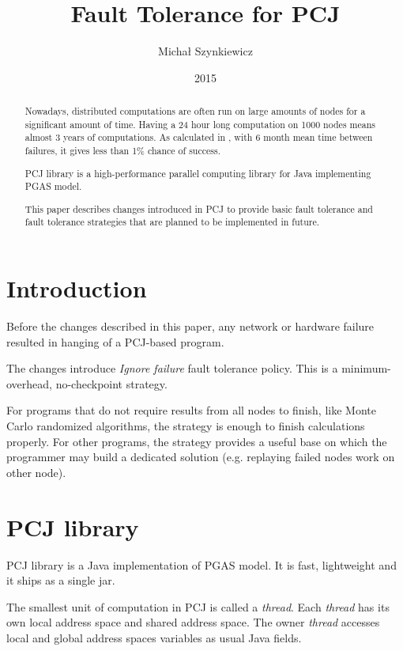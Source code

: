 \documentclass{llncs}
\begin{document}
\title{Fault Tolerance for PCJ}

\author{Michał Szynkiewicz}

\date{2015}
\maketitle

\begin{abstract}

Nowadays, distributed computations are often run on large amounts of nodes for a significant amount of time.
Having a 24 hour long computation on 1000 nodes means almost 3 years of computations.
As calculated in \cite{RX10}, with 6 month mean time between failures, it gives less than 1\% chance of success.

PCJ library is a high-performance parallel computing library for Java implementing PGAS model.

This paper describes changes introduced in PCJ to provide basic fault tolerance and fault tolerance strategies that are planned to be implemented in future.

\end{abstract}

\section{Introduction}
Before the changes described in this paper, any network or hardware failure resulted in hanging of a PCJ-based program.

The changes introduce \emph{Ignore failure} fault tolerance policy.
This is a minimum-overhead, no-checkpoint strategy.

For programs that do not require results from all nodes to finish, like Monte Carlo randomized algorithms, the strategy is enough to finish calculations properly.
For other programs, the strategy provides a useful base on which the programmer may build a dedicated solution (e.g. replaying failed nodes work on other node).


\section{PCJ library}
PCJ library is a Java implementation of PGAS model.
It is fast, lightweight and it ships as a single jar.

The smallest unit of computation in PCJ is called a \emph{thread}. Each \emph{thread} has its own local address space and shared address space.
The owner \emph{thread} accesses local and global address spaces variables as usual Java fields.
\end{document}
